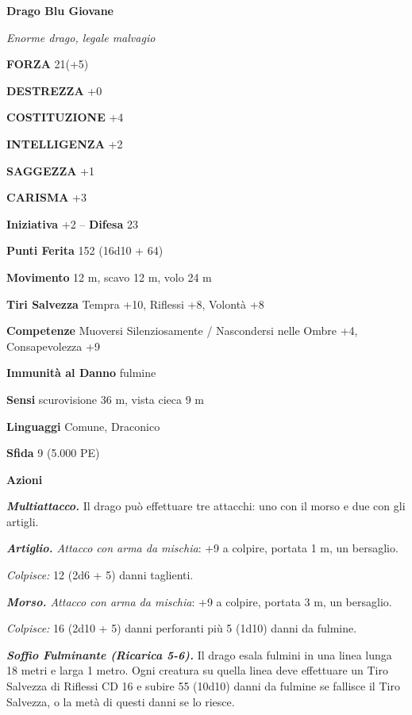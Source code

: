 \begin{multicols}{2}
\medskip{}\textbf{Drago Blu Giovane}

\emph{Enorme drago, legale malvagio}

\textbf{FORZA} 21(+5)

\textbf{DESTREZZA} +0

\textbf{COSTITUZIONE} +4

\textbf{INTELLIGENZA} +2

\textbf{SAGGEZZA} +1

\textbf{CARISMA} +3

\textbf{Iniziativa} +2 -- \textbf{Difesa} 23

\textbf{Punti Ferita} 152 (16d10 + 64)

\textbf{Movimento} 12 m, scavo 12 m, volo 24 m

\textbf{Tiri Salvezza} Tempra +10, Riflessi +8, Volontà +8

\textbf{Competenze} Muoversi Silenziosamente / Nascondersi nelle Ombre +4, Consapevolezza +9

\textbf{Immunità al Danno} fulmine

\textbf{Sensi} scurovisione 36 m, vista cieca 9 m 

\textbf{Linguaggi} Comune, Draconico

\textbf{Sfida} 9 (5.000 PE)

\textbf{Azioni}

\emph{\textbf{Multiattacco.}} Il drago può effettuare tre attacchi: uno con il morso e due con gli artigli.

\emph{\textbf{Artiglio.} Attacco con arma da mischia}: +9 a colpire, portata 1 m, un bersaglio.

\emph{Colpisce:} 12 (2d6 + 5) danni taglienti.

\emph{\textbf{Morso.} Attacco con arma da mischia}: +9 a colpire, portata 3 m, un bersaglio.

\emph{Colpisce:} 16 (2d10 + 5) danni perforanti più 5 (1d10) danni da fulmine.

\emph{\textbf{Soffio Fulminante (Ricarica 5-6).}} Il drago esala fulmini in una linea lunga 18 metri e larga 1 metro. Ogni creatura su quella linea deve effettuare un Tiro Salvezza di Riflessi CD 16 e subire 55 (10d10) danni da fulmine se fallisce il Tiro Salvezza, o la metà di questi danni se lo riesce.


\end{multicols}
